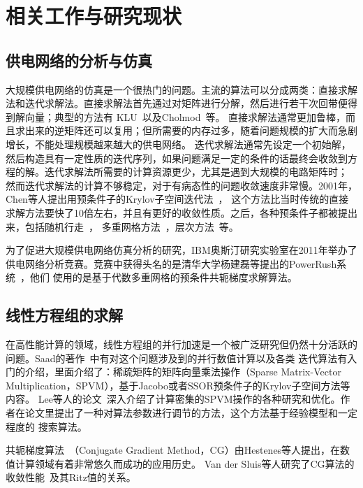 \chapter{相关工作与研究现状}
\label{cha:relatedworks}

\section{供电网络的分析与仿真}

大规模供电网络的仿真是一个很热门的问题。主流的算法可以分成两类：直接求解法和迭代求解法。直接求解法首先通过对矩阵进行分解，然后进行若干次回带便得到解向量；典型的方法有
KLU~\cite{davis2010algorithm}以及Cholmod~\cite{davis2005cholmod}等。
直接求解法通常更加鲁棒，而且求出来的逆矩阵还可以复用；但所需要的内存过多，随着问题规模的扩大而急剧增长，不能处理规模越来越大的供电网络。
迭代求解法通常先设定一个初始解，然后构造具有一定性质的迭代序列，如果问题满足一定的条件的话最终会收敛到方程的解。迭代求解法所需要的计算资源更少，尤其是遇到大规模的电路矩阵时；
然而迭代求解法的计算不够稳定，对于有病态性的问题收敛速度非常慢。2001年，Chen等人提出用预条件子的Krylov子空间迭代法~\cite{chen2001efficient}，
这个方法比当时传统的直接求解方法要快了10倍左右，并且有更好的收敛性质。之后，各种预条件子都被提出来，包括随机行走~\cite{qian2005power}，
多重网格方法~\cite{kozhaya2002multigrid}，层次方法~\cite{zhao2002hierarchical}等。

为了促进大规模供电网络仿真分析的研究，IBM奥斯汀研究实验室在2011年举办了供电网络分析竞赛。竞赛中获得头名的是清华大学杨建磊等提出的PowerRush系统~\cite{yang2012powerrush}，他们
使用的是基于代数多重网格的预条件共轭梯度求解算法。

\section{线性方程组的求解}

在高性能计算的领域，线性方程组的并行加速是一个被广泛研究但仍然十分活跃的问题。Saad的著作~\cite{saad2003iterative}中有对这个问题涉及到的并行数值计算以及各类
迭代算法有入门的介绍，里面介绍了：稀疏矩阵的矩阵向量乘法操作（Sparse Matrix-Vector Multiplication，SPVM），基于Jacobo或者SSOR预条件子的Krylov子空间方法等内容。
Lee等人的论文~\cite{lee2004performance}深入介绍了计算密集的SPVM操作的各种研究和优化。作者在论文里提出了一种对算法参数进行调节的方法，这个方法基于经验模型和一定程度的
搜索算法。

共轭梯度算法~\cite{hestenes1952methods}（Conjugate Gradient Method，CG）由Hestenes等人提出，在数值计算领域有着非常悠久而成功的应用历史。
Van der Sluis等人研究了CG算法的收敛性能~\cite{van1986rate}及其Ritz值的关系。

